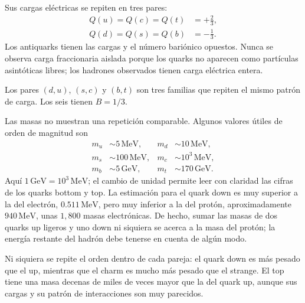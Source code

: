 Sus cargas eléctricas se repiten en tres pares:
\begin{equation}
\begin{aligned}
Q(u)=Q(c)=Q(t)&=+\frac23,
\\
Q(d)=Q(s)=Q(b)&=-\frac13.
\end{aligned}
\end{equation}
Los antiquarks tienen las cargas y el número bariónico opuestos. Nunca se observa carga fraccionaria aislada porque los quarks no aparecen como partículas asintóticas libres; los hadrones observados tienen carga eléctrica entera.

Los pares \((d,u)\), \((s,c)\) y \((b,t)\) son tres familias que repiten el mismo patrón de carga. Los seis tienen \(B=1/3\).

\begin{classroomqa}
\end{classroomqa}

Las masas no muestran una repetición comparable. Algunos valores útiles de orden de magnitud son
\begin{align}
m_u &\sim 5\,\mathrm{MeV},
&
m_d &\sim 10\,\mathrm{MeV},
\\
m_s &\sim 100\,\mathrm{MeV},
&
m_c &\sim 10^3\,\mathrm{MeV},
\\
m_b &\sim 5\,\mathrm{GeV},
&
m_t &\sim 170\,\mathrm{GeV}.
\end{align}
Aquí \(1\,\mathrm{GeV}=10^3\,\mathrm{MeV}\); el cambio de unidad permite leer con claridad las cifras de los quarks bottom y top. La estimación para el quark down es muy superior a la del electrón, \(0.511\,\mathrm{MeV}\), pero muy inferior a la del protón, aproximadamente \(940\,\mathrm{MeV}\), unas \(1{,}800\) masas electrónicas. De hecho, sumar las masas de dos quarks up ligeros y uno down ni siquiera se acerca a la masa del protón; la energía restante del hadrón debe tenerse en cuenta de algún modo.


Ni siquiera se repite el orden dentro de cada pareja: el quark down es más pesado que el up, mientras que el charm es mucho más pesado que el strange. El top tiene una masa decenas de miles de veces mayor que la del quark up, aunque sus cargas y su patrón de interacciones son muy parecidos.

